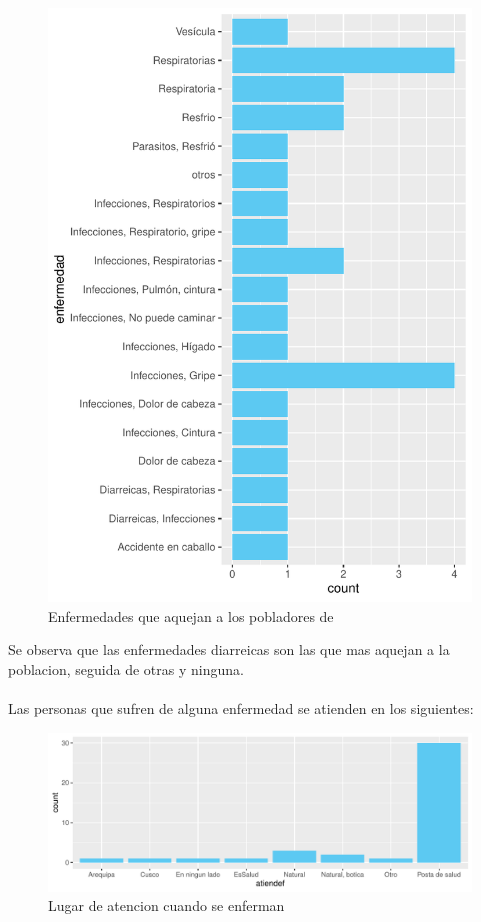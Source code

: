 \documentclass[12pt]{article}\usepackage[]{graphicx}\usepackage[]{xcolor}
\makeatletter
\def\maxwidth{ %
  \ifdim\Gin@nat@width>\linewidth
    \linewidth
  \else
    \Gin@nat@width
  \fi
}
\newenvironment{knitrout}{}{} %
\makeatother
\begin{document}
	\begin{figure}[H]
	\centering
\begin{knitrout}
\color{fgcolor}
\includegraphics[width=\maxwidth]{figure/nueve-1} 
\end{knitrout}
	\caption{Enfermedades que aquejan a los pobladores de \comunidad}
	\end{figure}
	Se observa que las enfermedades diarreicas son las que mas aquejan a la poblacion, seguida de otras y ninguna.\\
	\\
	Las personas que sufren de alguna enfermedad se atienden en los siguientes:
	\begin{figure}[H]
	\centering
\begin{knitrout}
\color{fgcolor}
\includegraphics[width=\maxwidth]{figure/once-1} 
\end{knitrout}
	\caption{Lugar de atencion cuando se enferman}
	\end{figure}
\end{document}
